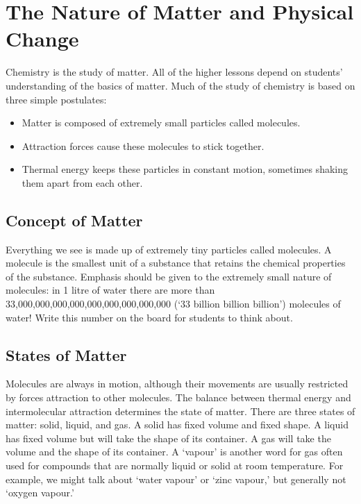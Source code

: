 \chapter{The Nature of Matter and Physical Change}

Chemistry is the study of matter. All of the higher lessons depend on students' understanding of the basics of matter. Much of the study of chemistry is based on three simple postulates:
\begin{itemize}
\item{Matter is composed of extremely small particles called molecules.}
\item{Attraction forces cause these molecules to stick together.}
\item{Thermal energy keeps these particles in constant motion, sometimes shaking them apart from each other.}
\end{itemize}


\section{Concept of Matter}

Everything we see is made up of extremely tiny particles called molecules. A molecule is the smallest unit of a substance that retains the chemical properties of the substance. Emphasis should be given to the extremely small nature of molecules: in 1 litre of water there are more than 33,000,000,000,000,000,000,000,000,000 (`33 billion billion billion') molecules of water! Write this number on the board for students to think about.


\section{States of Matter}

Molecules are always in motion, although their movements are usually restricted by forces attraction to other molecules. The balance between thermal energy and intermolecular attraction determines the state of matter.
There are three states of matter: solid, liquid, and gas. A solid has fixed volume and fixed shape. A liquid has fixed volume but will take the shape of its container. A gas will take the volume and the shape of its container. A `vapour' is another word for gas often used for compounds that are normally liquid or solid at room temperature. For example, we might talk about `water vapour' or `zinc vapour,' but generally not `oxygen vapour.'


